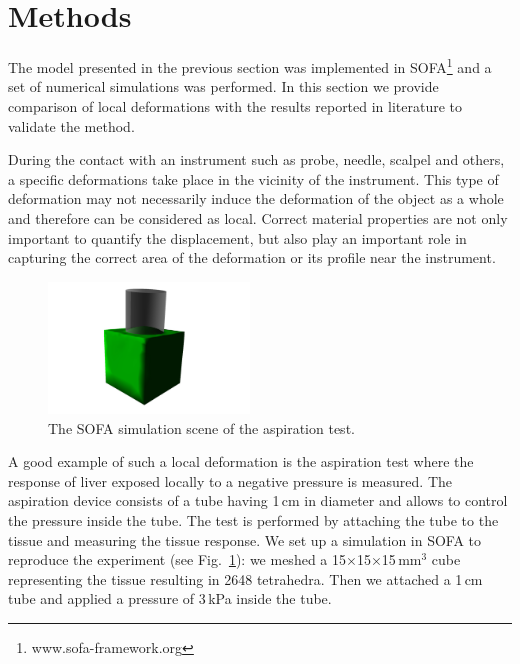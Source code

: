 \documentclass{acm_proc_article-sp}
\begin{document}
\section{Methods} %
The model presented in the previous section was implemented in 
SOFA\footnote{www.sofa-framework.org} and a set of
numerical simulations was performed.
In this section we provide comparison of local deformations with the
results reported in literature to validate the method.

During the contact with an instrument such as probe, needle, scalpel and others,
a specific deformations take place in the vicinity of
the instrument. This type of deformation may not necessarily induce the
deformation of the object as a whole and therefore can be considered as
local. Correct material properties are not only important to quantify the
displacement, but also play an important role in capturing the correct area of
the deformation or its profile near the instrument.

\begin{figure}
  \centering
  \includegraphics[height=3.5cm]{aspiration.jpg}
  \caption{\label{fig-aspiration1} The SOFA simulation scene of the aspiration test.}
\end{figure}

A good example of such a local deformation is the aspiration test
where the response of liver exposed locally to a negative pressure is measured.
The aspiration device consists of a tube having 1\,cm in diameter and allows to
control the pressure inside the tube. The test is performed by
attaching the tube to the tissue and measuring the tissue response. We
set up a simulation in SOFA to reproduce the experiment (see
Fig.~\ref{fig-aspiration1}): we meshed a 15$\times$15$\times$15\,mm$^3$ 
cube representing the tissue resulting in 2648 tetrahedra. Then we attached a 1\,cm tube 
and applied a pressure of 3\,kPa inside the tube. 
\end{document}
